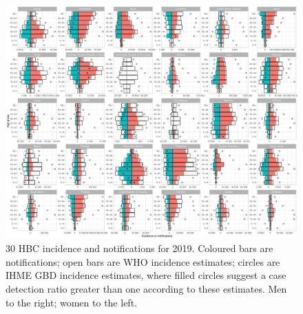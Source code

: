 \documentclass[12pt]{article}
\begin{document}
\FloatBarrier


\begin{figure}
\centering
\includegraphics[width=1\textwidth]{../plots/aF1.pdf}
\caption[30 HBC incidence and notifications]{30 HBC incidence and notifications
  for 2019.
  Coloured bars are notifications; open bars are WHO incidence estimates; circles are IHME GBD incidence estimates, where filled circles suggest a case detection ratio greater than one according to these estimates. Men to the right; women to the left.}
\end{figure}


\FloatBarrier




\FloatBarrier
\end{document}
